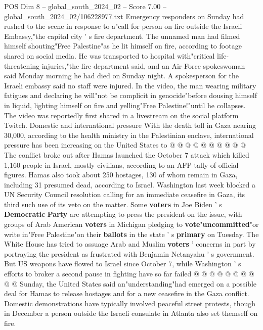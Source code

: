 \begin{textsample}{POS Dim 8 – global\_south\_2024\_02 – Score 7.00 – global\_south\_2024\_02/106228977.txt}  \label{ex:f8_pos_201}
Emergency responders on Sunday had rushed to the scene in response to a"call for person on fire outside the Israeli Embassy,"the capital city ' s fire department.
The unnamed man had filmed himself shouting"Free Palestine"as he lit himself on fire, according to footage shared on social media.
He was transported to hospital with"critical life-threatening injuries,"the fire department said, and an Air Force spokeswoman said Monday morning he had died on Sunday night.
A spokesperson for the Israeli embassy said no staff were injured.
In the video, the man wearing military fatigues and declaring he will"not be complicit in genocide"before dousing himself in liquid, lighting himself on fire and yelling"Free Palestine!"until he collapses.
The video was reportedly first shared in a livestream on the social platform Twitch.
Domestic and international pressure With the death toll in Gaza nearing 30,000, according to the health ministry in the Palestinian enclave, international pressure has been increasing on the United States to @ @ @ @ @ @ @ @ @ @ The conflict broke out after Hamas launched the October 7 attack which killed 1,160 people in Israel, mostly civilians, according to an AFP tally of official figures.
Hamas also took about 250 hostages, 130 of whom remain in Gaza, including 31 presumed dead, according to Israel.
Washington last week blocked a UN Security Council resolution calling for an immediate ceasefire in Gaza, its third such use of its veto on the matter.
Some \textbf{voters} in Joe Biden ' s \textbf{Democratic} \textbf{Party} are attempting to press the president on the issue, with groups of Arab American \textbf{voters} in Michigan pledging to \textbf{vote}"\textbf{uncommitted}"or write in"Free Palestine"on their \textbf{ballots} in the state ' s \textbf{primary} on Tuesday.
The White House has tried to assuage Arab and Muslim \textbf{voters} ' concerns in part by portraying the president as frustrated with Benjamin Netanyahu ' s government.
But US weapons have flowed to Israel since October 7, while Washington ' s efforts to broker a second pause in fighting have so far failed @ @ @ @ @ @ @ @ @ @ Sunday, the United States said an"understanding"had emerged on a possible deal for Hamas to release hostages and for a new ceasefire in the Gaza conflict.
Domestic demonstrations have typically involved peaceful street protests, though in December a person outside the Israeli consulate in Atlanta also set themself on fire.

\end{textsample}
